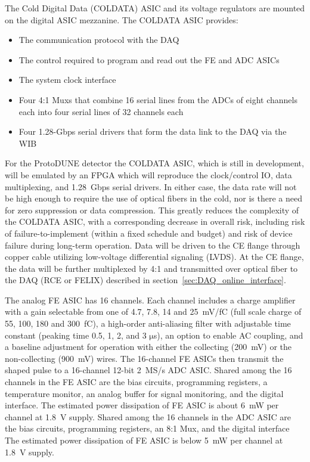 The Cold Digital Data (COLDATA) ASIC and its voltage regulators are mounted on the digital ASIC mezzanine.
The COLDATA ASIC provides:
\begin{itemize}
\item The communication protocol with the DAQ
\item The control required to program and read out the FE and ADC ASICs
\item The system clock interface
\item Four 4:1 Muxs that combine 16 serial lines from the ADCs of eight 
channels each into four serial lines of 32 channels each
\item Four 1.28-Gbps serial drivers that form the data link to the DAQ via the WIB
\end{itemize}
For the ProtoDUNE detector the COLDATA ASIC, which is still in development, will be 
emulated by an FPGA which will reproduce the clock/control IO, data multiplexing,
and 1.28~Gbps serial drivers.
In either case, the data rate will not be high enough to require the use of optical fibers in the cold,
nor is there a need for zero suppression or data compression.
This greatly reduces the complexity of the COLDATA ASIC, with a corresponding decrease in overall risk,
including risk of failure-to-implement (within a fixed schedule and budget)
and risk of device failure during long-term operation.
Data will be driven to the CE flange through copper cable utilizing low-voltage differential signaling (LVDS).
At the CE flange, the data will be further multiplexed by 4:1 and transmitted over optical
fiber to the DAQ (RCE or FELIX) described in section~\ref{sec:DAQ_online_interface}.

The analog FE ASIC has 16 channels.
Each channel includes a charge amplifier with a gain selectable from one of 4.7, 7.8, 14 and 25~mV/fC
(full scale charge of 55, 100, 180 and 300~fC),
a high-order anti-aliasing filter with adjustable time
constant (peaking time 0.5, 1, 2, and 3 $\mathrm{\mu}$s),
an option to enable AC coupling,
and a baseline adjustment for operation with either the collecting (200~mV) or the non-collecting (900~mV) wires.
The 16-channel FE ASICs then transmit the shaped pulse to a 16-channel 12-bit 2~MS/s ADC ASIC.
Shared among the 16 channels in the FE ASIC are the bias circuits, programming registers,
a temperature monitor, an analog buffer for signal monitoring, and the digital interface.
The estimated power dissipation of FE ASIC is about 6~mW per channel at 1.8~V supply.
Shared among the 16 channels in the ADC ASIC are the bias circuits, programming registers,
an 8:1 Mux, and the digital interface
The estimated power dissipation of FE ASIC is below 5~mW per channel at 1.8~V supply.


